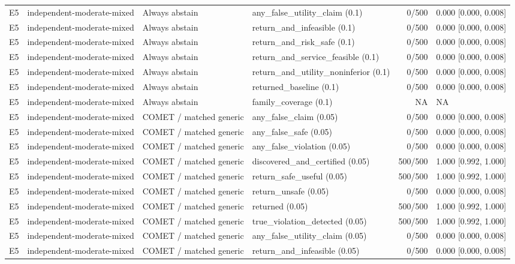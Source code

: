 \begin{longtable}{p{.04\linewidth}p{.18\linewidth}p{.19\linewidth}p{.16\linewidth}r p{.21\linewidth}}
E5 & independent-moderate-mixed & Always abstain & any\_false\_utility\_claim (0.1) & 0/500 & 0.000 [0.000, 0.008]\\
E5 & independent-moderate-mixed & Always abstain & return\_and\_infeasible (0.1) & 0/500 & 0.000 [0.000, 0.008]\\
E5 & independent-moderate-mixed & Always abstain & return\_and\_risk\_safe (0.1) & 0/500 & 0.000 [0.000, 0.008]\\
E5 & independent-moderate-mixed & Always abstain & return\_and\_service\_feasible (0.1) & 0/500 & 0.000 [0.000, 0.008]\\
E5 & independent-moderate-mixed & Always abstain & return\_and\_utility\_noninferior (0.1) & 0/500 & 0.000 [0.000, 0.008]\\
E5 & independent-moderate-mixed & Always abstain & returned\_baseline (0.1) & 0/500 & 0.000 [0.000, 0.008]\\
E5 & independent-moderate-mixed & Always abstain & family\_coverage (0.1) & NA & NA\\
E5 & independent-moderate-mixed & COMET / matched generic & any\_false\_claim (0.05) & 0/500 & 0.000 [0.000, 0.008]\\
E5 & independent-moderate-mixed & COMET / matched generic & any\_false\_safe (0.05) & 0/500 & 0.000 [0.000, 0.008]\\
E5 & independent-moderate-mixed & COMET / matched generic & any\_false\_violation (0.05) & 0/500 & 0.000 [0.000, 0.008]\\
E5 & independent-moderate-mixed & COMET / matched generic & discovered\_and\_certified (0.05) & 500/500 & 1.000 [0.992, 1.000]\\
E5 & independent-moderate-mixed & COMET / matched generic & return\_safe\_useful (0.05) & 500/500 & 1.000 [0.992, 1.000]\\
E5 & independent-moderate-mixed & COMET / matched generic & return\_unsafe (0.05) & 0/500 & 0.000 [0.000, 0.008]\\
E5 & independent-moderate-mixed & COMET / matched generic & returned (0.05) & 500/500 & 1.000 [0.992, 1.000]\\
E5 & independent-moderate-mixed & COMET / matched generic & true\_violation\_detected (0.05) & 500/500 & 1.000 [0.992, 1.000]\\
E5 & independent-moderate-mixed & COMET / matched generic & any\_false\_utility\_claim (0.05) & 0/500 & 0.000 [0.000, 0.008]\\
E5 & independent-moderate-mixed & COMET / matched generic & return\_and\_infeasible (0.05) & 0/500 & 0.000 [0.000, 0.008]\\

\end{longtable}
